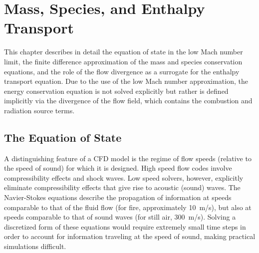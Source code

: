 

\chapter{Mass, Species, and Enthalpy Transport}

This chapter describes in detail the equation of state in the low Mach number limit, the finite difference approximation of the mass and species conservation equations, and the role of the flow divergence as a surrogate for the enthalpy transport equation.
Due to the use of the low Mach number approximation, the energy conservation equation is not solved explicitly but rather is defined implicitly via the divergence of the flow field, which contains the combustion and radiation source terms.


\section{The Equation of State}

A distinguishing feature of a CFD model is the regime of
flow speeds (relative to the speed of sound) for which it is designed. High
speed flow codes involve compressibility effects and shock waves. Low speed
solvers, however, explicitly eliminate compressibility effects that give rise
to acoustic (sound) waves. The Navier-Stokes equations describe the
propagation of information at speeds comparable to that of the fluid flow (for fire, approximately \SI{10}{m/s}),
but also at speeds comparable to that of sound waves (for still air,
\SI{300}{m/s}). Solving a discretized form of these equations would require extremely small
time steps in order to account for information traveling at the speed of sound, making
practical simulations difficult.

